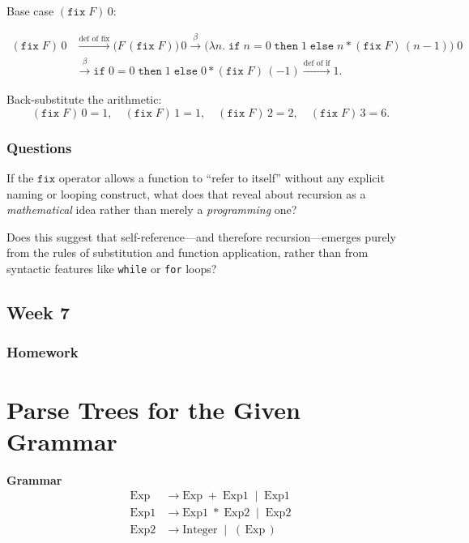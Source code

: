 \documentclass{article}
\theoremstyle{theorem}
\theoremstyle{definition}
\theoremstyle{remark}
\begin{document}
\noindent Base case $(\mathtt{fix}\;F)\,0$:

\[
\begin{aligned}
(\mathtt{fix}\;F)\,0
&\xrightarrow{\text{def of fix}} \big(F\,(\mathtt{fix}\;F)\big)\,0
\xrightarrow{\beta} \big(\lambda n.\; \mathtt{if}\; n=0\; \mathtt{then}\; 1\; \mathtt{else}\; n * (\mathtt{fix}\;F)\,(n-1)\big)\;0\\
&\xrightarrow{\beta} \mathtt{if}\; 0=0\; \mathtt{then}\; 1\; \mathtt{else}\; 0 * (\mathtt{fix}\;F)\,(-1)
\xrightarrow{\text{def of if}} 1.
\end{aligned}
\]

\noindent Back-substitute the arithmetic:
\[
(\mathtt{fix}\;F)\,0 = 1,\quad
(\mathtt{fix}\;F)\,1 = 1,\quad
(\mathtt{fix}\;F)\,2 = 2,\quad
(\mathtt{fix}\;F)\,3 = \boxed{6}.
\]



\subsubsection{Questions}

If the $\mathtt{fix}$ operator allows a function to ``refer to itself'' without any explicit naming or looping construct, what does that reveal about recursion as a \emph{mathematical} idea rather than merely a \emph{programming} one? 

Does this suggest that self-reference---and therefore recursion---emerges purely from the rules of substitution and function application, rather than from syntactic features like \texttt{while} or \texttt{for} loops?

\subsection{Week 7}

\subsubsection{Homework}

\newcommand{\tok}[1]{\texttt{#1}}

\section*{Parse Trees for the Given Grammar}

\noindent\textbf{Grammar}
\[
\begin{aligned}
\mathrm{Exp}  &\to \mathrm{Exp}\;{+}\;\mathrm{Exp1}\;\mid\;\mathrm{Exp1}\\
\mathrm{Exp1} &\to \mathrm{Exp1}\;{*}\;\mathrm{Exp2}\;\mid\;\mathrm{Exp2}\\
\mathrm{Exp2} &\to \mathrm{Integer}\;\mid\;(\,\mathrm{Exp}\,)
\end{aligned}
\]
\end{document}
